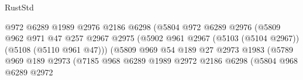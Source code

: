 \begin{lexlean}{RustStd}
\begin{coremodule}
                                                @972
                                                @6289
                                                @1989
                                                @2976
                                                @2186
                                                @6298
                                                (@5804
                                                  @972
                                                  @6289
                                                  @2976
                                                  (@5809
                                                    @962
                                                    @971
                                                    @47
                                                    @257
                                                    @2967
                                                    @2975
                                                    (@5902
                                                      @961
                                                      @2967
                                                      (@5103 (@5104 @2967))
                                                      (@5108 (@5110 @961 @47)))
                                                    (@5809
                                                      @969
                                                      @54
                                                      @189
                                                      @27
                                                      @2973
                                                      @1983
                                                      (@5789
                                                        @969
                                                        @189
                                                        @2973
                                                        (@7185
                                                          @968
                                                          @6289
                                                          @1989
                                                          @2972
                                                          @2186
                                                          @6298
                                                          (@5804
                                                            @968
                                                            @6289
                                                            @2972

\end{coremodule}
\end{lexlean}

